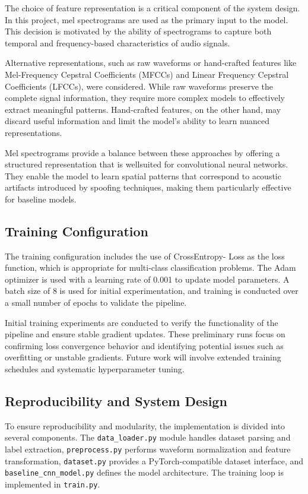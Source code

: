 \documentclass[conference]{IEEEtran}
\begin{document}
The choice of feature representation is a critical component
of the system design. In this project, mel spectrograms are used
as the primary input to the model. This decision is motivated
by the ability of spectrograms to capture both temporal and
frequency-based characteristics of audio signals.

Alternative representations, such as raw waveforms or
hand-crafted features like Mel-Frequency Cepstral Coefficients
(MFCCs) and Linear Frequency Cepstral Coefficients
(LFCCs), were considered. While raw waveforms preserve the
complete signal information, they require more complex models
to effectively extract meaningful patterns. Hand-crafted
features, on the other hand, may discard useful information
and limit the model’s ability to learn nuanced representations.

Mel spectrograms provide a balance between these approaches
by offering a structured representation that is wellsuited
for convolutional neural networks. They enable the
model to learn spatial patterns that correspond to acoustic
artifacts introduced by spoofing techniques, making them
particularly effective for baseline models.

\subsection{Training Configuration}

The training configuration includes the use of CrossEntropy-
Loss as the loss function, which is appropriate for multi-class
classification problems. The Adam optimizer is used with a
learning rate of 0.001 to update model parameters. A batch
size of 8 is used for initial experimentation, and training is
conducted over a small number of epochs to validate the
pipeline.

Initial training experiments are conducted to verify the
functionality of the pipeline and ensure stable gradient updates.
These preliminary runs focus on confirming loss convergence
behavior and identifying potential issues such as overfitting or
unstable gradients. Future work will involve extended training
schedules and systematic hyperparameter tuning.

\subsection{Reproducibility and System Design}

To ensure reproducibility and modularity, the implementation is divided into several components. The \texttt{data\_loader.py} module handles dataset parsing and label extraction, \texttt{preprocess.py} performs waveform normalization and feature transformation, \texttt{dataset.py} provides a PyTorch-compatible dataset interface, and \texttt{baseline\_cnn\_model.py} defines the model architecture. The training loop is implemented in \texttt{train.py}.
\end{document}
